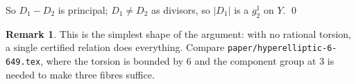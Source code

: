 \documentclass[11pt,reqno]{amsart}
\theoremstyle{plain}
\theoremstyle{definition}
\newtheorem{remark}[theorem]{Remark}
\begin{document}
So $D_1-D_2$ is principal; $D_1\neq D_2$ as divisors, so $|D_1|$ is a $g^1_2$ on $Y$. \qed

\begin{remark}
This is the simplest shape of the argument: with no rational torsion, a single certified relation does
everything. Compare \texttt{paper/hyperelliptic-6-649.tex}, where the torsion is bounded by $6$ and the
component group at $3$ is needed to make three fibres suffice.
\end{remark}
\end{document}
